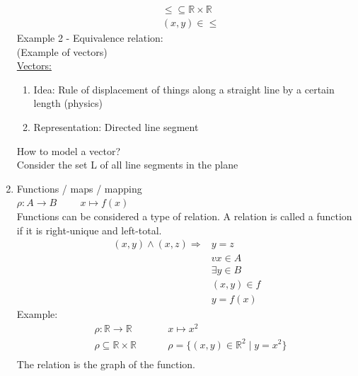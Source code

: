 \documentclass[a4paper,12pt]{article}
\makeatletter
\DeclarePairedDelimiter\norm{\lVert}{\rVert}%
\let\oldnorm\norm
\def\norm{\@ifstar{\oldnorm}{\oldnorm*}}
\makeatother
\begin{document}
\begin{enumerate}
\begin{align*}
		& \leqslant \subseteq \mathbb{R} \times \mathbb{R} \\
		& (x,y) \in \leqslant
	\end{align*}
	Example 2 - Equivalence relation: \\
	(Example of vectors) \\
	\underline{Vectors:} \\
	\begin{enumerate}
		\item Idea: Rule of displacement of things along a straight line by a certain length (physics)
		\item Representation: Directed line segment
	\end{enumerate}
	How to model a vector? \\ 
	Consider the set L of all line segments in the plane \\
	\item Functions / maps / mapping \\
	$ \rho: A \rightarrow B \hspace{1cm} x \mapsto f(x) $ \\
	Functions can be considered a type of relation. A relation is called a function if it is right-unique and left-total.
	\begin{align*}
		(x,y) \land (x,z) \Rightarrow & y = z \\
		& vx \in A \\
		& \exists y \in B \\
		& (x,y) \in f \\
		& y = f(x)
	\end{align*}
	Example: 
	\begin{align*}
		& \rho: \mathbb{R} \rightarrow \mathbb{R \hspace{1cm}} & x \mapsto x^2 \\ 
		& \rho \subseteq \mathbb{R} \times \mathbb{R} \hspace{1cm} 
		& \rho = \{ (x,y) \in \mathbb{R}^2 \;|\; y = x^2 \} \\
	\end{align*}
	The relation is the graph of the function.
\end{enumerate}
\end{document}
